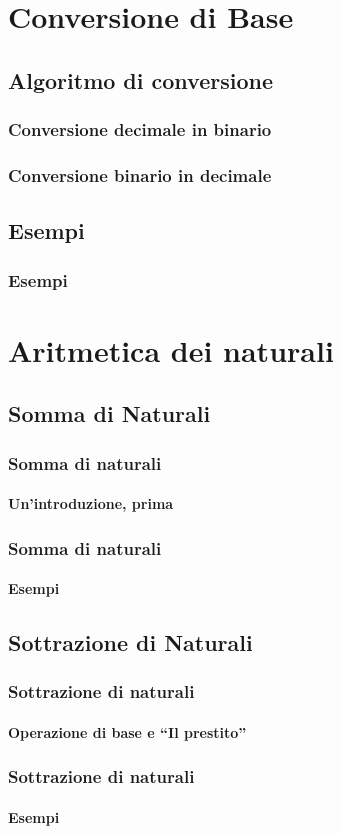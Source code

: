 \documentclass{beamer}
\begin{document}
  \section[Conversion]{Conversione di Base}
  \subsection{Algoritmo di conversione}
  \begin{frame}
    \frametitle{Conversione decimale in binario}
  \end{frame}
	\begin{frame}
    \frametitle{Conversione binario in decimale}
  \end{frame}  
  \subsection{Esempi}
  \begin{frame}
    \frametitle{Esempi}
  \end{frame}
  
  \section[Operations]{Aritmetica dei naturali}
	\subsection[NatSum]{Somma di Naturali}  
	  \begin{frame}
	    \frametitle{Somma di naturali}
	    \framesubtitle{Un'introduzione, prima}
	  \end{frame}
	  \begin{frame}
	    \frametitle{Somma di naturali}
	    \framesubtitle{Esempi}
	  \end{frame}
  \subsection[NatSub]{Sottrazione di Naturali}  
	  \begin{frame}
	    \frametitle{Sottrazione di naturali}
	    \framesubtitle{Operazione di base e ``Il prestito''}
	  \end{frame}
	  \begin{frame}
	    \frametitle{Sottrazione di naturali}
	    \framesubtitle{Esempi}
	  \end{frame}
\end{document}
